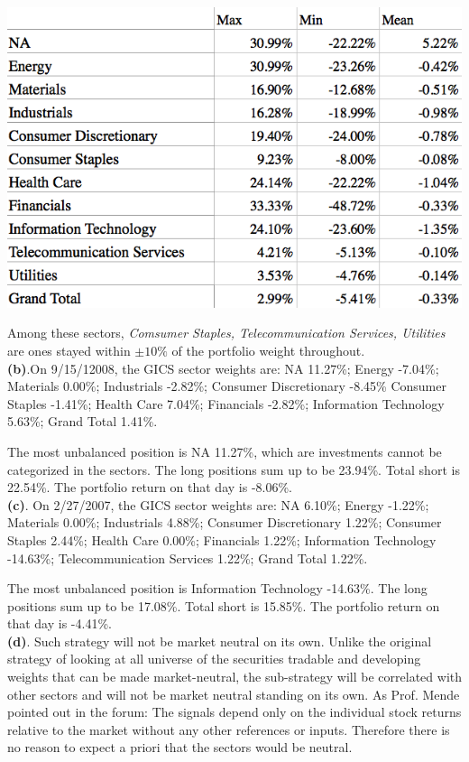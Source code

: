 \documentclass[11pt,letter]{article}
\begin{document}
\includegraphics[scale=0.4,keepaspectratio]{3a}

Among these sectors, \textit{Comsumer Staples, Telecommunication Services, Utilities} are ones stayed within $\pm 10\%$ of the portfolio weight throughout.\\

\textbf{(b)}.On 9/15/12008, the GICS sector weights are: 
NA	11.27\%; Energy	-7.04\%; Materials	0.00\%; Industrials	-2.82\%; Consumer Discretionary	-8.45\% Consumer Staples	-1.41\%; Health Care	7.04\%; Financials	-2.82\%; Information Technology	5.63\%; Grand Total	1.41\%.


The most unbalanced position is NA 11.27\%, which are investments cannot be categorized in the sectors. The long positions sum up to be 23.94\%. Total short is 22.54\%. The portfolio return on that day is -8.06\%.\\

\textbf{(c)}. On 2/27/2007, the GICS sector weights are:
NA	6.10\%; Energy	-1.22\%; Materials	0.00\%; Industrials	4.88\%; Consumer Discretionary	1.22\%; Consumer Staples	2.44\%; Health Care	0.00\%; Financials	1.22\%; Information Technology	-14.63\%; Telecommunication Services	1.22\%; Grand Total	1.22\%.


The most unbalanced position is Information Technology -14.63\%. The long positions sum up to be 17.08\%. Total short is 15.85\%. The portfolio return on that day is -4.41\%.\\


\textbf{(d)}. Such strategy will not be market neutral on its own. Unlike the original strategy of looking at all universe of the securities tradable and developing weights that can be made market-neutral, the sub-strategy will be correlated with other sectors and will not be market neutral standing on its own. As Prof. Mende pointed out in the forum: The signals depend only on the individual stock returns relative to the market without any other references or inputs. Therefore there is no reason to expect a priori that the sectors would be neutral.
\end{document}
